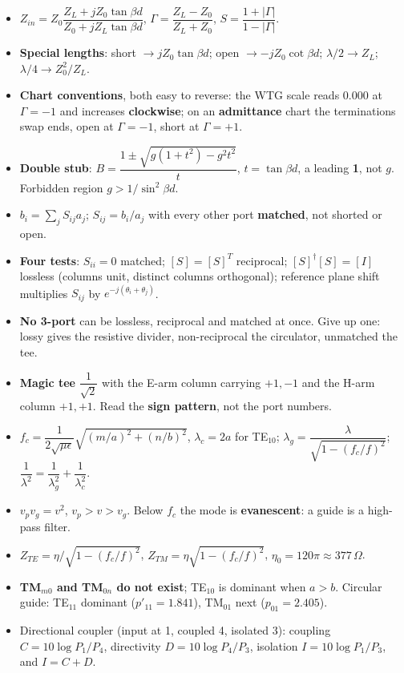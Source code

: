 \begin{itemize}
  \item $Z_{in} = Z_0\dfrac{Z_L + jZ_0\tan\beta d}{Z_0 + jZ_L\tan\beta d}$,
    $\Gamma = \dfrac{Z_L-Z_0}{Z_L+Z_0}$, $S = \dfrac{1+|\Gamma|}{1-|\Gamma|}$.
  \item \textbf{Special lengths}: short $\rightarrow jZ_0\tan\beta d$; open $\rightarrow
    -jZ_0\cot\beta d$; $\lambda/2 \rightarrow Z_L$; $\lambda/4 \rightarrow Z_0^2/Z_L$.
  \item \textbf{Chart conventions}, both easy to reverse: the WTG scale reads $0.000$ at
    $\Gamma=-1$ and increases \textbf{clockwise}; on an \textbf{admittance} chart the
    terminations swap ends, open at $\Gamma=-1$, short at $\Gamma=+1$.
  \item \textbf{Double stub}: $B = \dfrac{1 \pm \sqrt{g(1+t^2) - g^2t^2}}{t}$, $t=\tan\beta d$,
    a leading \textbf{1}, not $g$. Forbidden region $g > 1/\sin^2\beta d$.
\end{itemize}

\begin{itemize}
  \item $b_i = \sum_j S_{ij}a_j$; $S_{ij} = b_i/a_j$ with every other port
    \textbf{matched}, not shorted or open.
  \item \textbf{Four tests}: $S_{ii}=0$ matched; $[S]=[S]^T$ reciprocal;
    $[S]^\dagger[S]=[I]$ lossless (columns unit, distinct columns orthogonal); reference
    plane shift multiplies $S_{ij}$ by $e^{-j(\theta_i+\theta_j)}$.
  \item \textbf{No 3-port} can be lossless, reciprocal and matched at once. Give up one:
    lossy gives the resistive divider, non-reciprocal the circulator, unmatched the tee.
  \item \textbf{Magic tee} $\dfrac{1}{\sqrt2}$ with the E-arm column carrying $+1, -1$ and
    the H-arm column $+1, +1$. Read the \textbf{sign pattern}, not the port numbers.
\end{itemize}

\begin{itemize}
  \item $f_c = \dfrac{1}{2\sqrt{\mu\epsilon}}\sqrt{(m/a)^2+(n/b)^2}$,
    $\lambda_c = 2a$ for TE$_{10}$; $\lambda_g = \dfrac{\lambda}{\sqrt{1-(f_c/f)^2}}$;
    $\dfrac{1}{\lambda^2} = \dfrac{1}{\lambda_g^2} + \dfrac{1}{\lambda_c^2}$.
  \item $v_p v_g = v^2$, $v_p > v > v_g$. Below $f_c$ the mode is \textbf{evanescent}: a
    guide is a high-pass filter.
  \item $Z_{TE} = \eta/\sqrt{1-(f_c/f)^2}$, $Z_{TM} = \eta\sqrt{1-(f_c/f)^2}$,
    $\eta_0 = 120\pi \approx 377\,\Omega$.
  \item \textbf{TM$_{m0}$ and TM$_{0n}$ do not exist}; TE$_{10}$ is dominant when
    $a > b$. Circular guide: TE$_{11}$ dominant ($p'_{11}=1.841$), TM$_{01}$ next
    ($p_{01}=2.405$).
  \item Directional coupler (input at 1, coupled 4, isolated 3): coupling
    $C = 10\log P_1/P_4$, directivity $D = 10\log P_4/P_3$, isolation
    $I = 10\log P_1/P_3$, and $\boxed{I = C + D}$.
\end{itemize}

